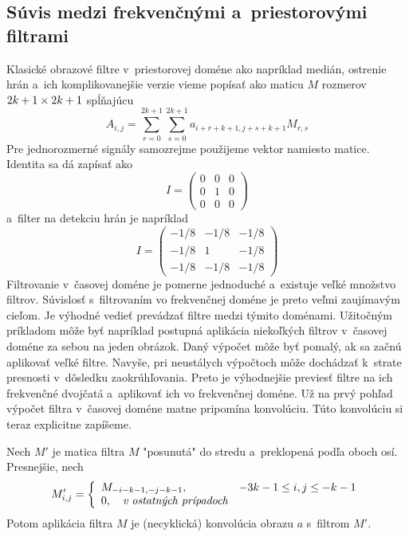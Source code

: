 \subsection{Súvis medzi frekvenčnými a~priestorovými filtrami}
Klasické obrazové filtre v~priestorovej doméne ako napríklad medián, 
ostrenie hrán a~ich komplikovanejšie verzie vieme popísať ako maticu
$M$ rozmerov $2k+1 \times 2k+1$ spĺňajúcu
\begin{equation*}
    A_{i,j} = \sum_{r=0}^{2k+1} \sum_{s=0}^{2k+1} a_{i+r+k+1, j+s+k+1} M_{r,s}
\end{equation*}
Pre jednorozmerné signály samozrejme použijeme vektor namiesto matice.
Identita sa dá zapísať ako 
\begin{equation*}
    I = \begin{pmatrix}
            0 & 0 & 0 \\
            0 & 1 & 0 \\
            0 & 0 & 0
        \end{pmatrix}
\end{equation*}
a~filter na detekciu hrán je napríklad
\begin{equation*}
    I = \begin{pmatrix}
            -1/8 & -1/8 & -1/8 \\
            -1/8 & 1 & -1/8 \\
            -1/8 & -1/8 & -1/8
        \end{pmatrix}
\end{equation*}
Filtrovanie v~časovej doméne je pomerne jednoduché a~existuje veľké
množstvo filtrov. Súvislosť s~filtrovaním vo frekvenčnej doméne je
preto veľmi zaujímavým cieľom. Je výhodné vedieť prevádzať filtre
medzi týmito doménami. Užitočným príkladom môže byť napríklad postupná
aplikácia niekoľkých filtrov v~časovej doméne za sebou na jeden obrázok.
Daný výpočet môže byť pomalý, ak sa začnú aplikovať veľké filtre.
Navyše, pri neustálych výpočtoch môže dochádzať k~strate presnosti 
v~dôsledku zaokrúhľovania. Preto je výhodnejšie previesť filtre na ich
frekvenčné dvojčatá a~aplikovať ich vo frekvenčnej doméne.
Už na prvý pohľad výpočet filtra v~časovej doméne matne pripomína
konvolúciu. Túto konvolúciu si teraz explicitne zapíšeme.
\begin{lema}
    Nech $M'$ je matica filtra $M$ "posunutá" do stredu a~preklopená
    podľa oboch osí. Presnejšie, nech 
    \begin{equation*}
        M'_{i,j} = \left\{
            \begin{array}{l l}
               M_{-i-k-1,-j-k-1}, \quad &  -3k-1 \le i,j \le -k-1 \\
               0, \quad \textit{v ostatných prípadoch}
            \end{array}
            \right.
    \end{equation*}
    Potom aplikácia filtra $M$ je (necyklická) konvolúcia obrazu
    $a$ s~filtrom $M'$.
    \label{lema:filter_konvolucia}
\end{lema}
